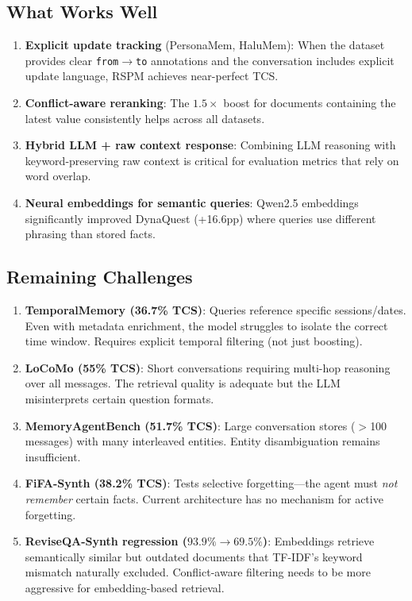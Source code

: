 \documentclass[11pt,a4paper]{article}
\begin{document}
\subsection{What Works Well}

\begin{enumerate}[nosep]
    \item \textbf{Explicit update tracking} (PersonaMem, HaluMem): When the
          dataset provides clear \texttt{from}$\to$\texttt{to} annotations and
          the conversation includes explicit update language, RSPM achieves
          near-perfect TCS.
    \item \textbf{Conflict-aware reranking}: The $1.5\times$ boost for documents
          containing the latest value consistently helps across all datasets.
    \item \textbf{Hybrid LLM + raw context response}: Combining LLM reasoning
          with keyword-preserving raw context is critical for evaluation metrics
          that rely on word overlap.
    \item \textbf{Neural embeddings for semantic queries}: Qwen2.5 embeddings
          significantly improved DynaQuest (+16.6pp) where queries use different
          phrasing than stored facts.
\end{enumerate}

\subsection{Remaining Challenges}

\begin{enumerate}[nosep]
    \item \textbf{TemporalMemory (36.7\% TCS)}: Queries reference specific
          sessions/dates. Even with metadata enrichment, the model struggles to
          isolate the correct time window.  Requires explicit temporal filtering
          (not just boosting).
    \item \textbf{LoCoMo (55\% TCS)}: Short conversations requiring multi-hop
          reasoning over all messages.  The retrieval quality is adequate but the
          LLM misinterprets certain question formats.
    \item \textbf{MemoryAgentBench (51.7\% TCS)}: Large conversation stores
          ($>$100 messages) with many interleaved entities.  Entity disambiguation
          remains insufficient.
    \item \textbf{FiFA-Synth (38.2\% TCS)}: Tests selective forgetting---the
          agent must \emph{not remember} certain facts.  Current architecture has
          no mechanism for active forgetting.
    \item \textbf{ReviseQA-Synth regression ($93.9\% \to 69.5\%$)}: Embeddings
          retrieve semantically similar but outdated documents that TF-IDF's
          keyword mismatch naturally excluded.  Conflict-aware filtering needs
          to be more aggressive for embedding-based retrieval.
\end{enumerate}
\end{document}

